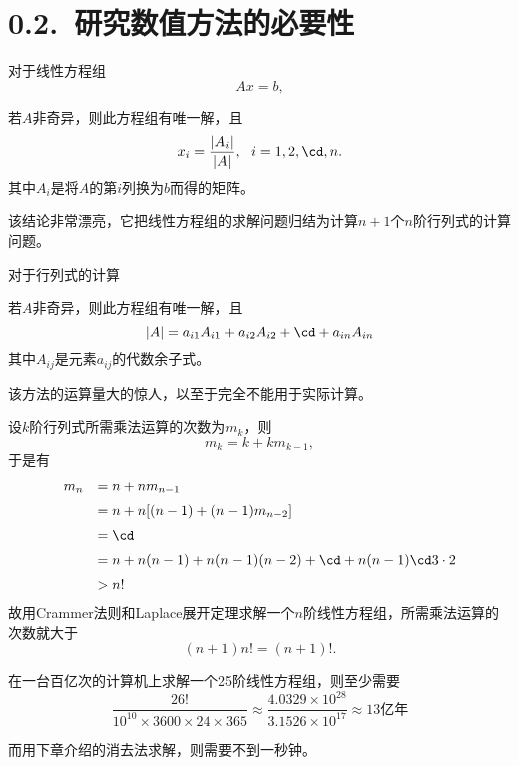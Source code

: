 \section{0.2.~研究数值方法的必要性}

\begin{frame}\ft{\secname}
\begin{small}
对于线性方程组
$$
Ax = b,
$$
\begin{dingli}[Crammer法则]
若$A$非奇异，则此方程组有唯一解，且
$$
x_i = \frac{|A_i|}{|A|}, ~~ i = 1, 2, \cd, n.
$$
其中$A_i$是将$A$的第$i$列换为$b$而得的矩阵。
\end{dingli}

\pause
该结论非常漂亮，它把线性方程组的求解问题归结为计算$n+1$个$n$阶行列式的计算问题。
\end{small}
\end{frame}

\begin{frame}\ft{\secname}
\begin{small}
对于行列式的计算
\begin{dingli}[Laplace展开定理]
若$A$非奇异，则此方程组有唯一解，且
$$
|A| = a_{i1} A_{i1} + a_{i2} A_{i2} +  \cd + a_{in} A_{in}
$$
其中$A_{ij}$是元素$a_{ij}$的代数余子式。
\end{dingli}

\pause
该方法的运算量大的惊人，以至于完全不能用于实际计算。
\end{small}
\end{frame}

\begin{frame}\ft{\secname}
\begin{small}
设$k$阶行列式所需乘法运算的次数为$m_k$，则
$$
m_k = k + k m_{k-1},
$$
于是有
$$
\begin{array}{ll}
m_n &= n + n m_{n-1} \\[0.2cm]
    &= n + n[(n-1) + (n-1) m_{n-2}] \\[0.2cm]
    &= \cd \\[0.2cm]
    &= n + n(n-1) + n(n-1)(n-2) + \cd + n(n-1)\cd 3 \cdot 2\\[0.2cm]
    &> n!
\end{array}
$$
故用Crammer法则和Laplace展开定理求解一个$n$阶线性方程组，所需乘法运算的次数就大于
$$
(n+1)n! = (n+1)!.
$$

\end{small}
\end{frame}

\begin{frame}\ft{\secname}
\begin{small}
在一台百亿次的计算机上求解一个25阶线性方程组，则至少需要
$$
\frac{26!}{10^{10}\times 3600 \times 24 \times 365}
\approx
\frac{4.0329\times 10^{28}}{3.1526\times 10^{17}}
\approx
13\mbox{亿年}
$$
\pause
\vspace{0.1in}

而用下章介绍的消去法求解，则需要不到一秒钟。
\end{small}
\end{frame}


